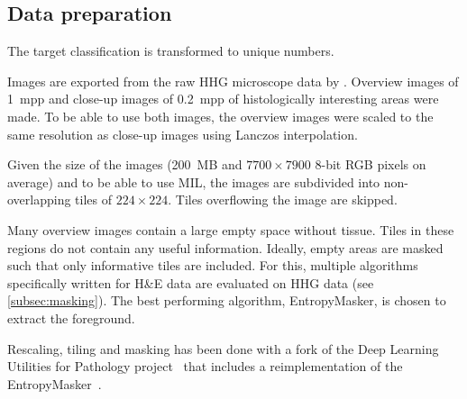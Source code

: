\subsection{Data preparation}

The target classification is transformed to unique numbers.

Images are exported from the raw HHG microscope data by \textcite{Spies2023}.
Overview images of \qty{1}{mpp} and close-up images of \qty{0.2}{mpp} of histologically interesting areas were made.
To be able to use both images, the overview images were scaled to the same resolution as close-up images using Lanczos interpolation.

Given the size of the images (\qty{200}{MB} and $7700\times7900$ 8-bit RGB pixels on average) and to be able to use MIL, the images are subdivided into non-overlapping tiles of $224 \times 224$.
Tiles overflowing the image are skipped.

Many overview images contain a large empty space without tissue.
Tiles in these regions do not contain any useful information.
Ideally, empty areas are masked such that only informative tiles are included.
For this, multiple algorithms specifically written for H\&E data are evaluated on HHG data (see \cref{subsec:masking}).
The best performing algorithm, EntropyMasker, is chosen to extract the foreground.

Rescaling, tiling and masking has been done with a fork of the Deep Learning Utilities for Pathology project~ that includes a reimplementation of the EntropyMasker~.
